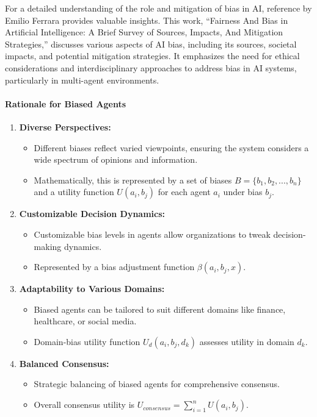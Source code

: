\documentclass{article}
\begin{document}
For a detailed understanding of the role and mitigation of bias in AI,
reference \cite{ferrara2023fairness} by Emilio Ferrara provides
valuable insights. This work, ``Fairness And Bias in Artificial
Intelligence: A Brief Survey of Sources, Impacts, And Mitigation
Strategies,'' discusses various aspects of AI bias, including its
sources, societal impacts, and potential mitigation strategies. It
emphasizes the need for ethical considerations and interdisciplinary
approaches to address bias in AI systems, particularly in multi-agent
environments.

\hypertarget{rationale-for-biased-agents}{%
\paragraph{Rationale for Biased
Agents}\label{rationale-for-biased-agents}}

\begin{enumerate}
\def\labelenumi{\arabic{enumi}.}
\item
  \textbf{Diverse Perspectives:}

\begin{itemize}
\item
  Different biases reflect varied viewpoints, ensuring the system
  considers a wide spectrum of opinions and information.
\item
  Mathematically, this is represented by a set of biases
  \( B = \{b_1, b_2, ..., b_n\} \) and a utility function
  \( U(a_i, b_j) \) for each agent \( a_i \) under bias
  \( b_j \).
\end{itemize}

\item
  \textbf{Customizable Decision Dynamics:}

  \begin{itemize}
  \item
    Customizable bias levels in agents allow organizations to tweak
    decision-making dynamics.
  \item
    Represented by a bias adjustment function
    \( \beta(a_i, b_j, x) \).
  \end{itemize}
\item
  \textbf{Adaptability to Various Domains:}

  \begin{itemize}
  \item
    Biased agents can be tailored to suit different domains like
    finance, healthcare, or social media.
  \item
    Domain-bias utility function \( U_d(a_i, b_j, d_k) \) assesses
    utility in domain \( d_k \).
  \end{itemize}
\item
  \textbf{Balanced Consensus:}

  \begin{itemize}
  \item
    Strategic balancing of biased agents for comprehensive consensus.
  \item
    Overall consensus utility is
    \( U_{consensus} = \sum_{i=1}^{n} U(a_i, b_j) \).
  \end{itemize}
\end{enumerate}
\end{document}
